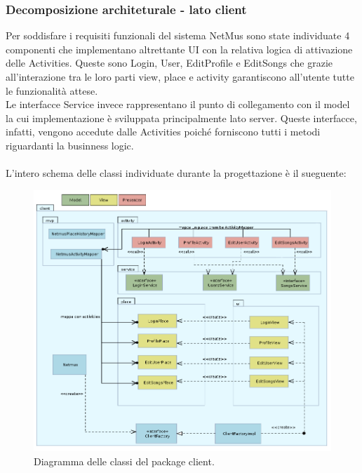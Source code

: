 \newpage
\subsubsection{Decomposizione architeturale - lato client}
Per soddisfare i requisiti funzionali del sistema NetMus sono state individuate
4 componenti che implementano altrettante UI con la relativa logica di
attivazione delle Activities. Queste sono Login, User, EditProfile e EditSongs
che grazie all'interazione tra le loro parti view, place e activity garantiscono
all'utente tutte le funzionalit\`a attese.\\
Le interfacce Service invece rappresentano il punto di collegamento con il model
la cui implementazione \`e sviluppata principalmente lato server. Queste
interfacce, infatti, vengono accedute dalle Activities poich\'e forniscono tutti i
metodi riguardanti la businness logic. \\\\ 
L'intero schema delle classi individuate durante la progettazione \`e il
sueguente: 
\begin{figure}[h]
  \centering
  \includegraphics[width=16.5cm]{img/ST/client.png}
\caption{Diagramma delle classi del package client.}
\end{figure}
\newpage
